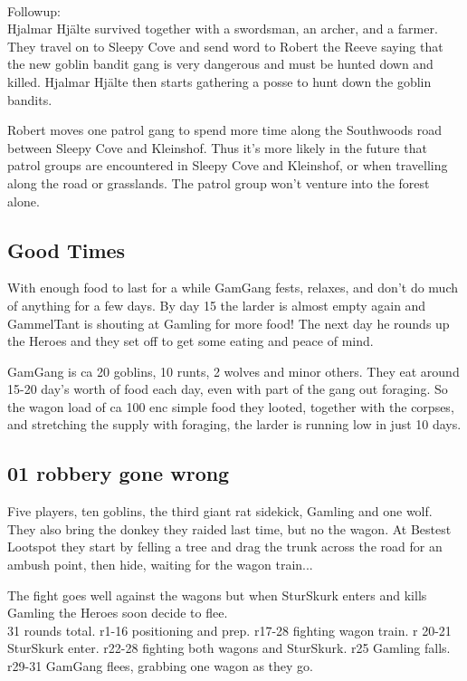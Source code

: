 \

Followup: \\
Hjalmar Hjälte survived together with a swordsman, an archer, and a farmer. They travel on to Sleepy Cove and send word to Robert the Reeve saying that the new goblin bandit gang is very dangerous and must be hunted down and killed. Hjalmar Hjälte then starts gathering a posse to hunt down the goblin bandits.

Robert moves one patrol gang to spend more time along the Southwoods road between Sleepy Cove and Kleinshof. Thus it's more likely in the future that patrol groups are encountered in Sleepy Cove and Kleinshof, or when travelling along the road or grasslands. The patrol group won't venture into the forest alone.


\subsection*{Good Times}

With enough food to last for a while GamGang fests, relaxes, and don't do much of anything for a few days. By day 15 the larder is almost empty again and GammelTant is shouting at Gamling for more food! The next day he rounds up the Heroes and they set off to get some eating and peace of mind.

GamGang is ca 20 goblins, 10 runts, 2 wolves and minor others. They eat around 15-20 day's worth of food each day, even with part of the gang out foraging. So the wagon load of ca 100 enc simple food they looted, together with the corpses, and stretching the supply with foraging, the larder is running low in just 10 days.


\subsection*{01 robbery gone wrong}

Five players, ten goblins, the third giant rat sidekick, Gamling and one wolf. They also bring the donkey they raided last time, but no the wagon. At Bestest Lootspot they start by felling a tree and drag the trunk across the road for an ambush point, then hide, waiting for the wagon train...

The fight goes well against the wagons but when SturSkurk enters and kills Gamling the Heroes soon decide to flee.\\
31 rounds total. r1-16 positioning and prep. r17-28 fighting wagon train. r 20-21 SturSkurk enter. r22-28 fighting both wagons and SturSkurk. r25 Gamling falls. r29-31 GamGang flees, grabbing one wagon as they go.

